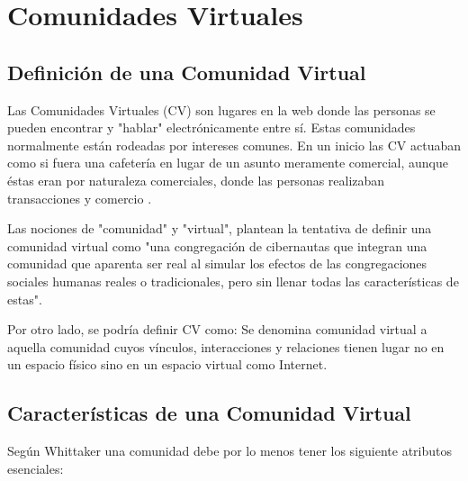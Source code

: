 
\chapter{Comunidades Virtuales} %

\label{ch:comunidades_virtuales} %


\section{Definición de una Comunidad Virtual}

Las Comunidades Virtuales (CV) son lugares en la web donde las personas se pueden encontrar y "hablar" electrónicamente entre sí. Estas comunidades normalmente están rodeadas por intereses comunes. En un inicio las CV actuaban como si fuera una cafetería en lugar de un asunto meramente comercial, aunque éstas eran por naturaleza comerciales, donde las personas realizaban transacciones y comercio \cite{gupta:2005}. 

Las nociones de "comunidad" y "virtual", plantean la tentativa de definir una comunidad virtual como "una congregación de cibernautas que integran una comunidad que aparenta ser real al simular los efectos de las congregaciones sociales humanas reales o tradicionales, pero sin llenar todas las características de estas".

Por otro lado, se podría definir CV como: Se denomina comunidad virtual a aquella comunidad cuyos vínculos, interacciones y relaciones tienen lugar no en un espacio físico sino en un espacio virtual como Internet.



\section{Características de una Comunidad Virtual}

Según Whittaker \cite{whittaker:1997} una comunidad debe por lo menos tener los siguiente atributos esenciales: 

